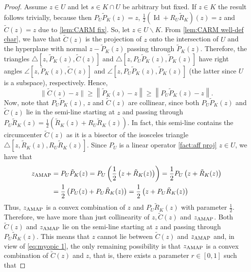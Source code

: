 \documentclass[smallextended,numbook,nospthms]{svjour3}
\theoremstyle{plain}
\theoremstyle{definition}
\DeclareMathOperator{\Id}{Id}
\newcommand{\AMAP}{{\rm AMAP}}
\begin{document}
\begin{proof}
	Assume $z \in U$ and let $s \in K \cap U$ be arbitrary but fixed. If $z \in K$ the result follows trivially, because then $P_{U} \tilde{P}_{K}(z)=z$, $\frac{1}{2}\left(\Id+R_{U} \tilde{R}_{K}\right)(z)=z$ and $\tilde{C}(z)=z$ due to  \cref{lem:CARM fix}. So, let $z \in U \backslash K$. From  \cref{lem:CARM well-def char}, we have that $\tilde{C}(z)$ is the projection of $z$ onto the intersection of $U$ and the hyperplane with normal $z-\tilde{P}_{K}(z)$ passing through $\tilde{P}_{K}(z)$. Therefore, the triangles $\triangle{[z, \tilde{P}_{K}(z), \tilde{C}(z)]}$ and $\triangle{[z, P_{U}\tilde{P}_{K}(z), \tilde{P}_{K}(z)]}$ have right angles $\angle{[z, \tilde{P}_{K}(z), \tilde{C}(z)]}$ and $\angle{[z,P_{U}\tilde{P}_{K}(z), \tilde{P}_{K}(z)]}$ (the latter since $U$ is a subspace), respectively. Hence,
	\begin{equation}\label{eq:myopic 1}
		\|\tilde{C}(z)-z\| \geq\left\|\tilde{P}_{K}(z)-z\right\| \geq\left\|P_{U}\tilde{P}_{K}(z)-z\right\|.	\end{equation}
	Now, note that $P_{U}\tilde{P}_{K}(z)$, $z$ and $\tilde{C}(z)$ are collinear, since both $P_{U} \tilde{P}_{K}(z)$ and $\tilde{C}(z)$ lie in the semi-line starting at $z$ and passing through $P_{U}\tilde{R}_{K}(z)=\frac{1}{2}\left(\tilde{R}_{K}(z)+R_{U}\tilde{R}_{K}(z)\right)$. In fact, this semi-line contains the circumcenter $\tilde{C}(z)$ as it is a bisector of the isosceles triangle $\triangle{[z, \tilde{R}_{K}(z),R_{U}\tilde{R}_{K}(z)]}$. Since $P_{U}$ is a linear operator \cref{fact:aff proj} $z \in U$, we have that
	\begin{align}
		z_{\mathrm{\AMAP}} &=P_{U} \tilde{P}_{K}(z)=P_{U}\left(\frac{1}{2}\left(z+\tilde{R}_{K}(z)\right)\right)=\frac{1}{2} P_{U}\left(z+\tilde{R}_{K}(z)\right) \\
		&=\frac{1}{2}\left(P_{U}(z)+P_{U} \tilde{R}_{K}(z)\right)=\frac{1}{2}\left(z+P_{U} \tilde{R}_{K}(z)\right)
	\end{align}
	Thus, $z_{\AMAP}$ is a convex combination of $z$ and $P_{U}\tilde{R}_{K}(z)$ with parameter $\frac{1}{2}$. Therefore, we have more than just collinearity of $z, \tilde{C}(z)$ and $z_{\AMAP}$. Both $\tilde{C}(z)$ and $z_{\AMAP}$ lie on the semi-line starting at $z$ and passing through $P_{U}\tilde{R}_{K}(z)$. This means that $z$ cannot lie between $\tilde{C}(z)$ and $z_{\AMAP}$ and, in view of \cref{eq:myopic 1}, the only remaining possibility is that $z_{\AMAP}$ is a convex combination of $\tilde{C}(z)$ and $z$, that is, there exists a parameter $r \in[0,1]$ such that

\end{proof}
\end{document}
